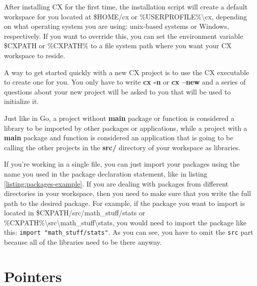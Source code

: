 \documentclass[11pt,fleqn,openany]{book} %
\begin{document}
After installing CX for the first time, the installation script will create a default workspace for you located at \$HOME/cx or \%USERPROFILE\%\textbackslash cx, depending on what operating system you are using: unix-based systems or Windows, respectively. If you want to override this, you can set the environment variable \$CXPATH or \%CXPATH\% to a file system path where you want your CX workspace to reside.

A way to get started quickly with a new CX project is to use the CX executable to create one for you. You only have to write \textbf{cx -n} or \textbf{cx --new} and a series of questions about your new project will be asked to you that will be used to initialize it.

Just like in Go, a project without \textbf{main} package or function is considered a library to be imported by other packages or applications, while a project with a \textbf{main} package and function is considered an application that is going to be calling the other projects in the \textbf{src/} directory of your workspace as libraries.

If you're working in a single file, you can just import your packages using the name you used in the package declaration statement, like in listing \ref{listing:packages-example}. If you are dealing with packages from different directories in your workspace, then you need to make sure that you write the full path to the desired package. For example, if the package you want to import is located in \$CXPATH/src/math\_stuff/stats or \%CXPATH\%\textbackslash src\textbackslash math\_stuff\textbackslash stats, you would need to import the package like this: \lstinline{import "math_stuff/stats"}. As you can see, you have to omit the \lstinline{src} part because all of the libraries need to be there anyway.


\chapter{Pointers}
\label{chapter:pointers}
\end{document}
